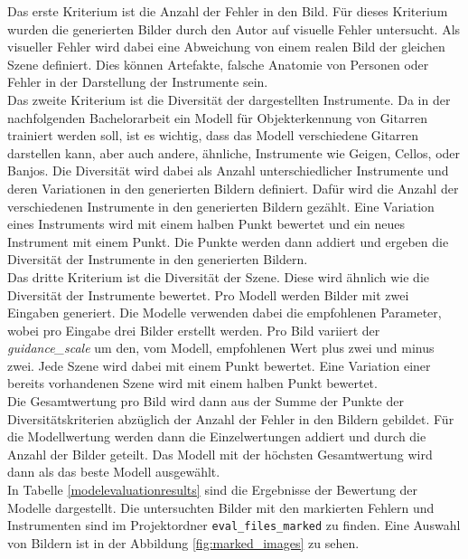 Das erste Kriterium ist die Anzahl der Fehler in den Bild. Für dieses Kriterium wurden die generierten Bilder durch den Autor auf visuelle Fehler untersucht. Als visueller Fehler wird dabei eine Abweichung von einem realen Bild der gleichen Szene definiert. Dies können Artefakte, falsche Anatomie von Personen oder Fehler in der Darstellung der Instrumente sein.\\
Das zweite Kriterium ist die Diversität der dargestellten Instrumente. Da in der nachfolgenden Bachelorarbeit ein Modell für Objekterkennung von Gitarren trainiert werden soll, ist es wichtig, dass das Modell verschiedene Gitarren darstellen kann, aber auch andere, ähnliche, Instrumente wie Geigen, Cellos, oder Banjos. Die Diversität wird dabei als Anzahl unterschiedlicher Instrumente und deren Variationen in den generierten Bildern definiert. Dafür wird die Anzahl der verschiedenen Instrumente in den generierten Bildern gezählt. Eine Variation eines Instruments wird mit einem halben Punkt bewertet und ein neues Instrument mit einem Punkt. Die Punkte werden dann addiert und ergeben die Diversität der Instrumente in den generierten Bildern.\\
Das dritte Kriterium ist die Diversität der Szene. Diese wird ähnlich wie die Diversität der Instrumente bewertet. Pro Modell werden Bilder mit zwei Eingaben generiert. Die Modelle verwenden dabei die empfohlenen Parameter, wobei pro Eingabe drei Bilder erstellt werden. Pro Bild variiert der \emph{guidance\_scale} um den, vom Modell, empfohlenen Wert plus zwei und minus zwei. Jede Szene wird dabei mit einem Punkt bewertet. Eine Variation einer bereits vorhandenen Szene wird mit einem halben Punkt bewertet.\\
Die Gesamtwertung pro Bild wird dann aus der Summe der Punkte der Diversitätskriterien abzüglich der Anzahl der Fehler in den Bildern gebildet. Für die Modellwertung werden dann die Einzelwertungen addiert und durch die Anzahl der Bilder geteilt. Das Modell mit der höchsten Gesamtwertung wird dann als das beste Modell ausgewählt.\\
In Tabelle \ref{modelevaluationresults} sind die Ergebnisse der Bewertung der Modelle dargestellt. Die untersuchten Bilder mit den markierten Fehlern und Instrumenten sind im Projektordner \texttt{eval\_files\_marked} zu finden. Eine Auswahl von Bildern ist in der Abbildung \ref{fig:marked_images} zu sehen.

